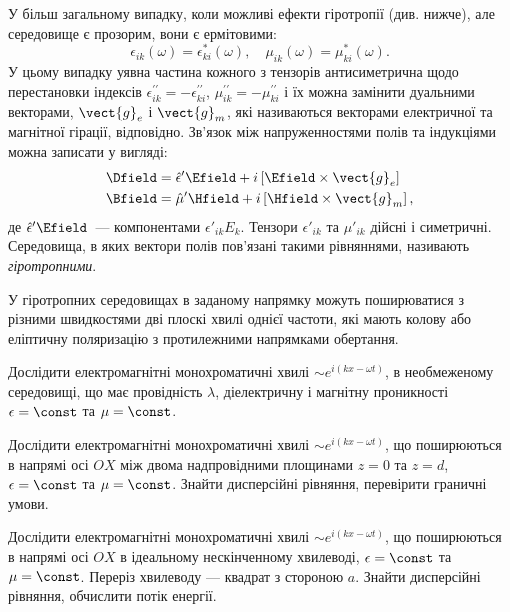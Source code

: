 \begin{Theory}
	У більш загальному випадку, коли можливі ефекти гіротропії (див. нижче), але середовище є
	прозорим, вони є ермітовими:
	\begin{equation}\label{eq:symm_e_m}
		\epsilon_{ik}(\omega) = \epsilon_{ki}^*(\omega), \quad \mu_{ik}(\omega) = \mu_{ki}^*(\omega).
	\end{equation}
	У цьому випадку уявна частина кожного з тензорів антисиметрична щодо перестановки індексів
	$\epsilon^{\prime\prime}_{ik} = -\epsilon^{\prime\prime}_{ki}$, $\mu^{\prime\prime}_{ik} =
	-\mu^{\prime\prime}_{ki}$  і їх можна замінити дуальними векторами, $\vect{g}_e$ і $\vect{g}_m$,
	які називаються векторами електричної та магнітної гірації, відповідно.  Зв'язок між
	напруженностями полів та індукціями можна записати у вигляді:
	\begin{align}
		\Dfield & = \hat{\epsilon}' \Efield + i\left[ \Efield\times\vect{g}_e\right] \\
		\Bfield & = \hat{\mu}' \Hfield + i\left[ \Hfield\times\vect{g}_m\right] ,
	\end{align}
	де $\hat{\epsilon}' \Efield$~--- компонентами $\epsilon'_{ik}E_k $. Тензори $\epsilon'_{ik}$ та
	$\mu'_{ik}$ дійсні і симетричні. Середовища, в яких вектори полів пов'язані такими рівняннями,
	називають \emph{гіротропними}.

	У гіротропних середовищах в заданому напрямку можуть поширюватися з різними швидкостями дві плоскі
	хвилі однієї частоти, які мають  колову або еліптичну поляризацію з протилежними напрямками
	обертання.
\end{Theory}
\begin{problem}
Дослідити електромагнітні монохроматичні хвилі $\sim e^{i(kx - \omega t)}$, в необмеженому середовищі,
що має провідність $\lambda$, діелектричну і магнітну проникності $\epsilon = \const$ та $\mu =
\const$.
\end{problem}

\begin{problem}
Дослідити електромагнітні монохроматичні хвилі $\sim e^{i(kx - \omega t)}$, що поширюються в напрямі
осі $OX$ між двома надпровідними площинами $z=0$ та $z=d$, $\epsilon = \const$ та $\mu = \const$.
Знайти дисперсійні рівняння, перевірити граничні умови.
\end{problem}

\begin{problem}
Дослідити електромагнітні монохроматичні хвилі $\sim e^{i(kx - \omega t)}$, що поширюються в напрямі
осі $OX$ в ідеальному нескінченному хвилеводі, $\epsilon = \const$ та $\mu = \const$. Переріз
хвилеводу --- квадрат з стороною $a$. Знайти дисперсійні рівняння, обчислити потік енергії.
\end{problem}

